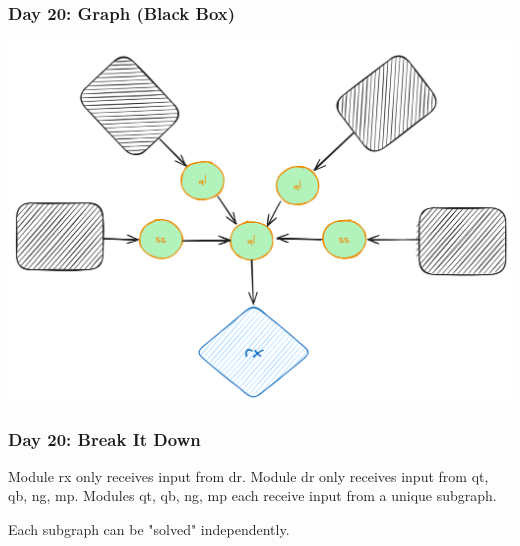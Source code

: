 \begin{frame}
\frametitle{Day 20: Graph (Black Box)}

\includegraphics[width=\textwidth]{Day20BlackBox}

\end{frame}

\begin{frame}
\frametitle{Day 20: Break It Down}

Module rx only receives input from dr.\linebreak
Module dr only receives input from qt, qb, ng, mp.\linebreak
Modules qt, qb, ng, mp each receive input from a unique subgraph.\vfill

Each subgraph can be "solved" independently.

\end{frame}